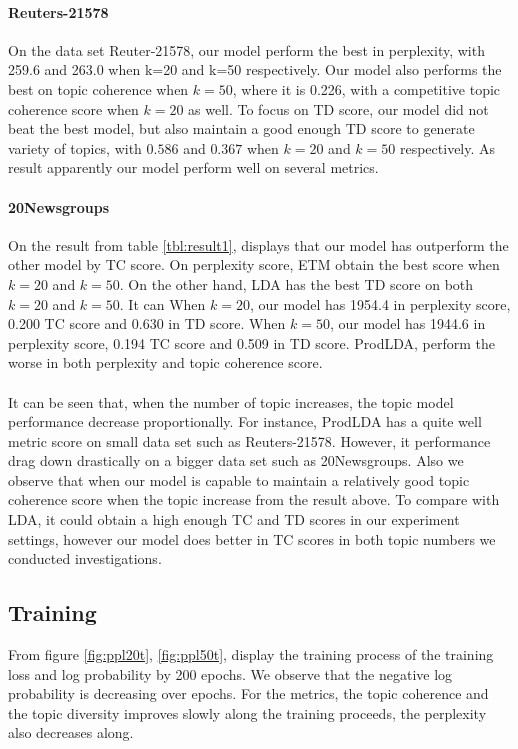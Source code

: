 \paragraph{Reuters-21578}
On the data set Reuter-21578, our model perform the best in perplexity, with 259.6 and 263.0 when k=20 and k=50 respectively. Our model also performs the best on topic coherence when $ k=50 $, where it is 0.226, with a competitive topic coherence score when $ k=20 $ as well. To focus on TD score, our model did not beat the best model, but also maintain a good enough TD score to generate variety of topics, with $ 0.586 $ and $ 0.367 $ when $ k=20 $ and $ k=50 $ respectively.
As result apparently our model perform well on several metrics. 
\paragraph{20Newsgroups}
On the result from table \ref{tbl:result1}, displays that our model has outperform the other model by TC score. On perplexity score, ETM obtain the best score when $ k=20 $ and $ k=50 $. On the other hand, LDA has the best TD score on both $ k=20 $ and $ k=50 $. It can 
When $ k=20 $, our model has 1954.4 in perplexity score, 0.200 TC score and 0.630 in TD score. When $ k=50 $, our model has 1944.6 in perplexity score, 0.194 TC score and 0.509 in TD score.
ProdLDA, perform the worse in both perplexity and topic coherence score.
\paragraph{}It can be seen that, when the number of topic increases, the topic model performance decrease proportionally.
For instance, ProdLDA has a quite well metric score on small data set such as Reuters-21578. However, it performance drag down drastically on a bigger data set such as 20Newsgroups.
Also we observe that when our model is capable to maintain a relatively good topic coherence score when the topic increase from the result above.
To compare with LDA, it could obtain a high enough TC and TD scores in our experiment settings, however our model does better in TC scores in both topic numbers we conducted investigations.
\subsection{Training}
From figure \ref{fig:ppl20t}, \ref{fig:ppl50t}, display the training process of the training loss and log probability by 200 epochs. We observe that the negative log probability is decreasing over epochs. For the metrics, the topic coherence and the topic diversity improves slowly along the training proceeds, the perplexity also decreases along.
